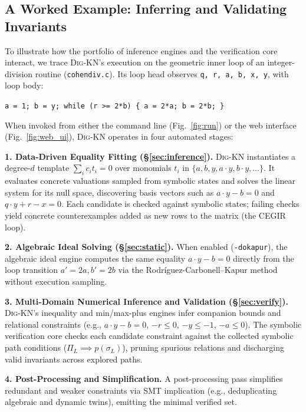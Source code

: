 \documentclass[runningheads]{llncs}
\newcommand{\tool}{\textsc{Dig-KN}\xspace}
\newcommand{\code}[1]{\texttt{\small #1}}
\begin{document}
\subsection{A Worked Example: Inferring and Validating Invariants}
\label{sec:example}
To illustrate how the portfolio of inference engines and the verification core interact, we trace \tool{}'s execution on the geometric inner loop of an integer-division routine (\code{cohendiv.c}). Its loop head observes \code{q, r, a, b, x, y}, with loop body:
\begin{center}
\code{a = 1;\ b = y;\ while (r >= 2*b) \{ a = 2*a;\ b = 2*b; \}}
\end{center}
When invoked from either the command line (Fig.~\ref{fig:run}) or the web interface (Fig.~\ref{fig:web_ui}), \tool{} operates in four automated stages:

\medskip\noindent\textbf{1. Data-Driven Equality Fitting (\S\ref{sec:inference}).}
\tool{} instantiates a degree-$d$ template $\sum_i c_i t_i = 0$ over monomials $t_i$ in $\{a, b, y, a\cdot y, b\cdot y, \dots\}$. It evaluates concrete valuations sampled from symbolic states and solves the linear system for its null space, discovering basis vectors such as $a\cdot y - b = 0$ and $q\cdot y + r - x = 0$. Each candidate is checked against symbolic states; failing checks yield concrete counterexamples added as new rows to the matrix (the CEGIR loop).

\medskip\noindent\textbf{2. Algebraic Ideal Solving (\S\ref{sec:static}).}
When enabled (\code{-dokapur}), the algebraic ideal engine computes the same equality $a\cdot y - b = 0$ directly from the loop transition $a' = 2a, b' = 2b$ via the Rodr\'iguez-Carbonell--Kapur method without execution sampling.

\medskip\noindent\textbf{3. Multi-Domain Numerical Inference and Validation (\S\ref{sec:verify}).}
\tool{}'s inequality and min/max-plus engines infer companion bounds and relational constraints (e.g., $a\cdot y - b = 0$, $-r \le 0$, $-y \le -1$, $-a \le 0$). The symbolic verification core checks each candidate constraint against the collected symbolic path conditions ($\Pi_L \implies p(\sigma_L)$), pruning spurious relations and discharging valid invariants across explored paths.

\medskip\noindent\textbf{4. Post-Processing and Simplification.}
A post-processing pass simplifies redundant and weaker constraints via SMT implication (e.g., deduplicating algebraic and dynamic twins), emitting the minimal verified set.
\end{document}
